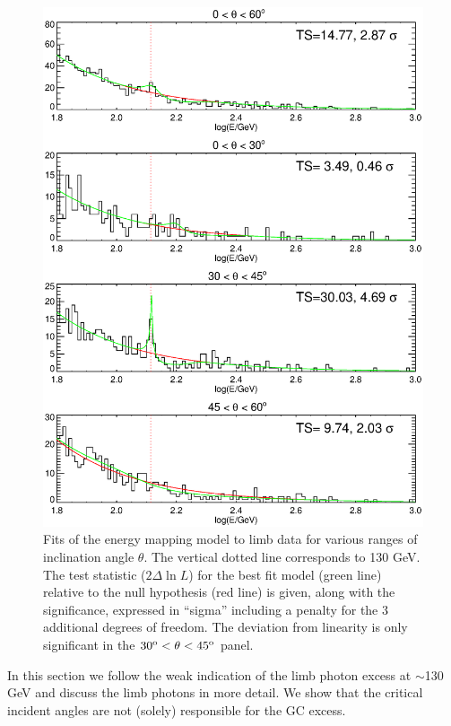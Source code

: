 \documentclass[aps,twocolumn,prd,superscriptaddress,showpacs,nofootinbib,fixfloat]{revtex4}
\newcommand{\degree}{^{\rm o}}
\begin{document}
\begin{figure}
\centering
\includegraphics[width=1.0\linewidth]{plots/limbfits.ps}
\caption{Fits of the energy mapping model to limb data for various ranges of
  inclination angle $\theta$.  The vertical dotted line corresponds to 130
  GeV.  The test statistic ($2\Delta\ln L$) for the best fit model (green
  line) relative to the null hypothesis (red line) is given, along with the
  significance, expressed in ``sigma'' including a penalty for the 3
  additional degrees of freedom.  The deviation from linearity is only
  significant in the $30\degree < \theta < 45\degree$ panel.}
\label{fig:limbfits}
\end{figure}


In this section we follow the weak indication of the limb
photon excess at $\sim$130 GeV and discuss the limb photons
in more detail. We show that the critical incident angles
are not (solely) responsible for the GC excess.
\end{document}
